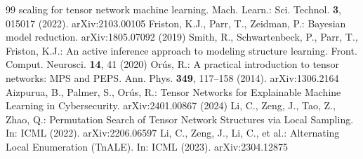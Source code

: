 \documentclass[runningheads]{llncs}
\begin{document}
\begin{thebibliography}{99}
scaling for tensor network machine learning. Mach. Learn.: Sci. Technol. \textbf{3},
015017 (2022). arXiv:2103.00105
 Friston, K.J., Parr, T., Zeidman, P.: Bayesian model reduction.
arXiv:1805.07092 (2019)
 Smith, R., Schwartenbeck, P., Parr, T., Friston, K.J.: An active
inference approach to modeling structure learning. Front. Comput. Neurosci. \textbf{14},
41 (2020)
 Or\'{u}s, R.: A practical introduction to tensor networks: MPS and
PEPS. Ann. Phys. \textbf{349}, 117--158 (2014). arXiv:1306.2164
 Aizpurua, B., Palmer, S., Or\'{u}s, R.: Tensor Networks for
Explainable Machine Learning in Cybersecurity. arXiv:2401.00867 (2024)
 Li, C., Zeng, J., Tao, Z., Zhao, Q.: Permutation Search of Tensor
Network Structures via Local Sampling. In: ICML (2022). arXiv:2206.06597
 Li, C., Zeng, J., Li, C., et al.: Alternating Local Enumeration
(TnALE). In: ICML (2023). arXiv:2304.12875
\end{thebibliography}
\end{document}
